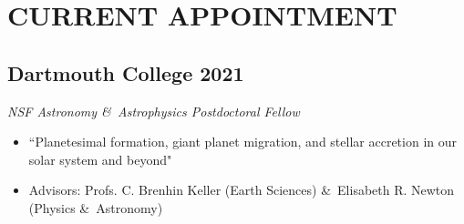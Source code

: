 \section*{CURRENT APPOINTMENT}
\subsection*{\textbf{Dartmouth College} \hfill 2021\ongoing}
\textit{NSF Astronomy \&\ Astrophysics Postdoctoral Fellow}
\begin{itemize}
	\item[] ``Planetesimal formation, giant planet migration, and stellar accretion in our solar system and beyond"
	\item[] Advisors: Profs. C. Brenhin Keller (Earth Sciences) \&\ Elisabeth R. Newton (Physics \&\ Astronomy)
\end{itemize}